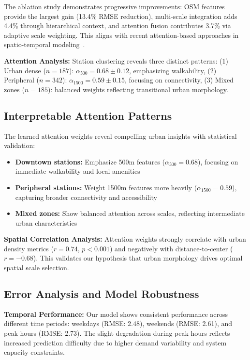 \documentclass[10pt,twocolumn]{article}
\begin{document}
The ablation study demonstrates progressive improvements: OSM features provide the largest gain (13.4\% RMSE reduction), multi-scale integration adds 4.4\% through hierarchical context, and attention fusion contributes 3.7\% via adaptive scale weighting. This aligns with recent attention-based approaches in spatio-temporal modeling~\cite{wu2019,guo2020}.

\textbf{Attention Analysis:} Station clustering reveals three distinct patterns: (1) Urban dense ($n=187$): $\alpha_{500} = 0.68 \pm 0.12$, emphasizing walkability, (2) Peripheral ($n=342$): $\alpha_{1500} = 0.59 \pm 0.15$, focusing on connectivity, (3) Mixed zones ($n=185$): balanced weights reflecting transitional urban morphology.

\subsection{Interpretable Attention Patterns}
The learned attention weights reveal compelling urban insights with statistical validation:
\begin{itemize}
\item \textbf{Downtown stations:} Emphasize 500m features ($\alpha_{500} = 0.68$), focusing on immediate walkability and local amenities
\item \textbf{Peripheral stations:} Weight 1500m features more heavily ($\alpha_{1500} = 0.59$), capturing broader connectivity and accessibility  
\item \textbf{Mixed zones:} Show balanced attention across scales, reflecting intermediate urban characteristics
\end{itemize}

\textbf{Spatial Correlation Analysis:} Attention weights strongly correlate with urban density metrics ($r = 0.74$, $p < 0.001$) and negatively with distance-to-center ($r = -0.68$). This validates our hypothesis that urban morphology drives optimal spatial scale selection.

\subsection{Error Analysis and Model Robustness}
\textbf{Temporal Performance:} Our model shows consistent performance across different time periods: weekdays (RMSE: 2.48), weekends (RMSE: 2.61), and peak hours (RMSE: 2.73)\@. The slight degradation during peak hours reflects increased prediction difficulty due to higher demand variability and system capacity constraints.
\end{document}
